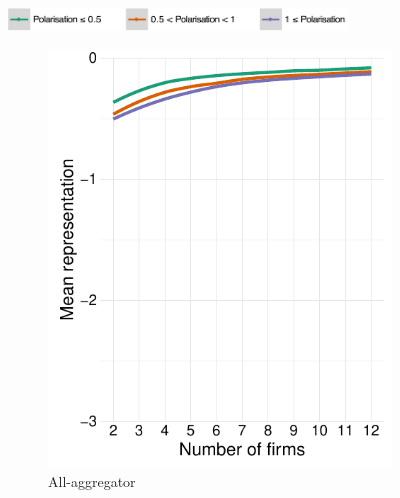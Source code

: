 \documentclass[preprint, 12pt]{elsarticle}
\begin{document}
\begin{figure}[ht!]
	\centering
	\caption{Mean representation where $\mu \in [0, 1.5]$ and $n_l/n_r \in [1, 2]$.}
	\includegraphics[width=90mm]{Graphics/legend_pol.pdf}
	
	\begin{subfigure}[t]{0.315\textwidth}
		\centering
		\includegraphics[width=\textwidth, trim={8mm 0 0 0}]{Graphics/fig333a_tall.pdf}
		\caption{All-aggregator}
		\label{fig:representation_aggregator}
	\end{subfigure}
	~
	\begin{subfigure}[t]{0.315\textwidth}
		\centering

\end{subfigure}
\end{figure}
\end{document}
